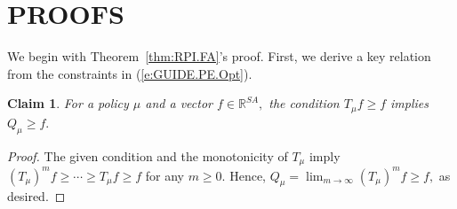 \documentclass[twoside]{article}
\theoremstyle{plain}
\newtheorem{claim}[theorem]{Claim}
\theoremstyle{definition}
\theoremstyle{remark}
\newcommand{\bR}{\mathbb{R}}
\renewcommand{\eqref}[1]{(\ref{#1})}
\begin{document}
\onecolumn
{}


\section{PROOFS}
\label{s:apdx.Proofs}
%

We begin with Theorem~\ref{thm:RPI.FA}'s proof.  First, we derive a key relation from the constraints in \eqref{e:GUIDE.PE.Opt}. 

\begin{claim}
\label{c:Q.mu.lower.Bd}
    For a policy $\mu$ and a vector $f \in \bR^{SA},$ the condition $T_\mu f \geq f$ implies $Q_\mu \geq f.$
\end{claim}
%
\begin{proof}
%
The given condition and the monotonicity of $T_\mu$ imply $(T_\mu)^m f \geq \cdots \geq T_\mu f \geq f$
%
for any $m \geq 0.$ Hence, $Q_\mu = \lim_{m \to \infty} (T_{\mu} )^m f \geq f,$ as desired.
%
\end{proof}
\end{document}
